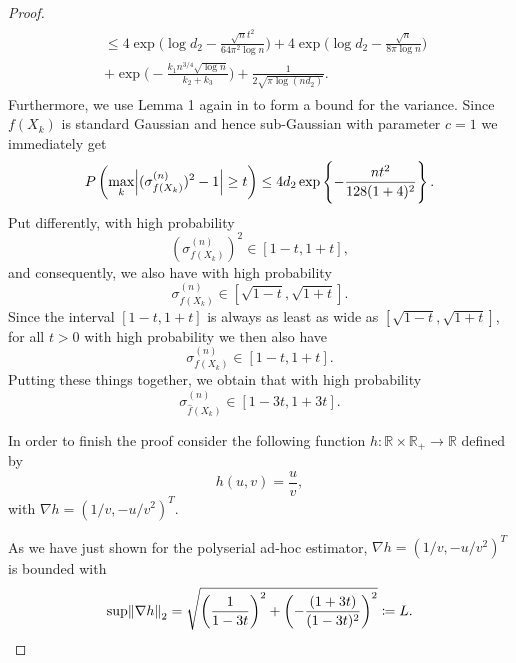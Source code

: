 \begin{proof}
\begin{multline*}
        \begin{aligned}
             & \leq 4\exp\Big(\log d_2 -\frac{\sqrt{n}t^2}{64 \pi^2\log n}\Big) +  4\exp\Big(\log d_2 - \frac{\sqrt{n}}{8\pi\log n}\Big) \\
             & +  \exp\Big(- \frac{k_1 n^{3/4} \sqrt{\log n}}{k_2+ k_3} \Big) + \frac{1}{2\sqrt{\pi \log(nd_2)}}.
        \end{aligned}
    \end{multline*}
    Furthermore, we use Lemma 1 again in \cite{Ravikumar11} to form a bound for the variance. Since $f(X_k)$ is standard Gaussian and hence sub-Gaussian with parameter $c = 1$ we immediately get
    \begin{equation*}
        P\left(\max_k \abs{(\sigma^{(n)}_{{f}(X_k)})^2 - 1} \geq t \right) \leq 4d_2\exp \left\{- \frac{nt^2}{128(1+4)^2} \right\}.
    \end{equation*}
    Put differently, with high probability
    \begin{equation*}
        (\sigma^{(n)}_{{f}(X_k)})^2 \in [1 - t, 1+ t],
    \end{equation*}
    and consequently, we also have with high probability
    \begin{equation*}
        \sigma^{(n)}_{{f}(X_k)} \in [\sqrt{1 -t}, \sqrt{1+t} ].
    \end{equation*}
    Since the interval $[1 -t, 1+t ]$ is always as least as wide as $[\sqrt{1 -t}, \sqrt{1+t} ]$, for all $t >0$ with high probability we then also have
    \begin{equation*}
        \sigma^{(n)}_{{f}(X_k)} \in [1 -t, 1+t ].
    \end{equation*}
    Putting these things together, we obtain that with high probability
    \begin{equation*}
        \sigma^{(n)}_{\hat{f}(X_k)} \in [1- 3t, 1 +3t].
    \end{equation*}

    In order to finish the proof consider the following function $h: \mathbb{R}\times \mathbb{R}_+ \to \mathbb{R}$ defined by
    \begin{equation*}
        h(u,v) = \frac{u}{v},
    \end{equation*}
    with $\nabla h = (1/v, -u/v^{2})^{T}$.

    As we have just shown for the polyserial ad-hoc estimator, $\nabla h = (1/v, -u/v^2)^T$ is bounded with
    \begin{equation*}
        \sup \norm{\nabla h}_2 = \sqrt{\left(\frac{1}{1- 3t}\right)^2 + \left(-\frac{(1 + 3t)}{(1 - 3t)^2}\right)^2} \coloneqq L.
    \end{equation*}


\end{proof}
